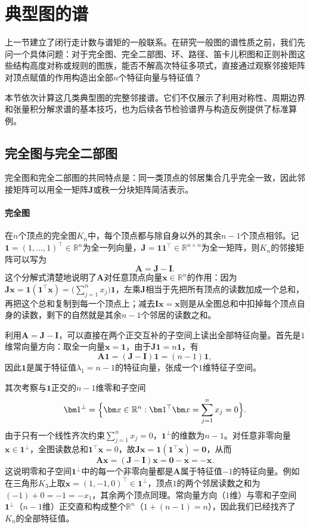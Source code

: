 \section{典型图的谱}
\label{sec:adjacency-standard-spectra}

上一节建立了闭行走计数与谱矩的一般联系。在研究一般图的谱性质之前，我们先问一个具体问题：对于完全图、完全二部图、环、路径、笛卡儿积图和正则补图这些结构高度对称或规则的图族，能否不解高次特征多项式，直接通过观察邻接矩阵对顶点赋值的作用构造出全部$n$个特征向量与特征值？

本节依次计算这几类典型图的完整邻接谱。它们不仅展示了利用对称性、周期边界和张量积分解求谱的基本技巧，也为后续各节检验谱界与构造反例提供了标准算例。

\subsection{完全图与完全二部图}
\label{sec:adjacency-complete-spectra}

完全图和完全二部图的共同特点是：同一类顶点的邻居集合几乎完全一致，因此邻接矩阵可以用全一矩阵$\bm J$或秩一分块矩阵简洁表示。

\paragraph{完全图}

在$n$个顶点的完全图$K_n$中，每个顶点都与除自身以外的其余$n-1$个顶点相邻。记$\bm 1=(1,\ldots,1)^\top\in\mathbb R^n$为全一列向量，$\bm J=\bm 1\bm 1^\top\in\mathbb R^{n\times n}$为全一矩阵，则$K_n$的邻接矩阵可以写为
\[
\bm A=\bm J-\bm I.
\]
这个分解式清楚地说明了$\bm A$对任意顶点向量$\bm x\in\mathbb R^n$的作用：因为$\bm J\bm x=\bm 1(\bm 1^\top\bm x)=\bigl(\sum_{j=1}^n x_j\bigr)\bm 1$，左乘$\bm J$相当于先把所有顶点的读数加成一个总和，再把这个总和复制到每一个顶点上；减去$\bm I\bm x=\bm x$则是从全图总和中扣掉每个顶点自身的读数，剩下的自然就是其余$n-1$个邻居的读数之和。

利用$\bm A=\bm J-\bm I$，可以直接在两个正交互补的子空间上读出全部特征向量。首先是$1$维常向量方向：取全一向量$\bm x=\bm 1$，由于$\bm J\bm 1=n\bm 1$，有
\[
\bm A\bm 1=(\bm J-\bm I)\bm 1=(n-1)\bm 1,
\]
因此$\bm 1$是属于特征值$\lambda_1=n-1$的特征向量，张成一个$1$维特征子空间。

其次考察与$\bm 1$正交的$n-1$维零和子空间
\[
\bm 1^\perp=\Bigl\{\bm x\in\mathbb R^n:\bm 1^\top\bm x=\sum_{j=1}^n x_j=0\Bigr\}.
\]
由于只有一个线性齐次约束$\sum_{j=1}^n x_j=0$，$\bm 1^\perp$的维数为$n-1$。对任意非零向量$\bm x\in\bm 1^\perp$，全图读数总和$\bm 1^\top\bm x=0$，故$\bm J\bm x=\bm 1(\bm 1^\top\bm x)=\bm 0$，从而
\[
\bm A\bm x=(\bm J-\bm I)\bm x=\bm 0-\bm x=-\bm x.
\]
这说明零和子空间$\bm 1^\perp$中的每一个非零向量都是$\bm A$属于特征值$-1$的特征向量。例如在三角形$K_3$上取$\bm x=(1,-1,0)^\top\in\bm 1^\perp$，顶点$1$的两个邻居读数之和为$(-1)+0=-1=-x_1$，其余两个顶点同理。常向量方向（$1$维）与零和子空间$\bm 1^\perp$（$n-1$维）正交直和构成整个$\mathbb R^n$（$1+(n-1)=n$），因此我们已经找齐了$K_n$的全部特征值。

